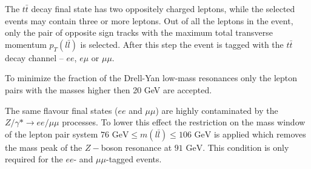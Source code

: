 The $t\bar{t}$ decay final state has two oppositely charged leptons, while the selected events may contain three or more leptons.
Out of all the leptons in the event, only the pair of opposite sign tracks with the maximum total transverse momentum $p_{T}(l\bar{l})$
is selected. After this step the event is tagged with the $t\bar{t}$ decay channel -- $ee$, $e\mu$ or $\mu\mu$.

To minimize the fraction of the Drell-Yan low-mass resonances only the lepton pairs with the masses higher then 20 GeV are accepted. 

The same flavour final states ($ee$ and $\mu\mu$) are highly contaminated by the $Z/\gamma * \to ee/\mu\mu$ processes. To lower this effect
the restriction on the mass window of the lepton pair system $\textrm{76 GeV} \leq m(l\bar{l}) \leq \textrm{106 GeV}$ is applied which removes  
the mass peak of the $Z-$boson resonance at $\textrm{91 GeV}$. This condition is only required for the $ee$- and $\mu\mu$-tagged events.

%
% 
% 
% 
